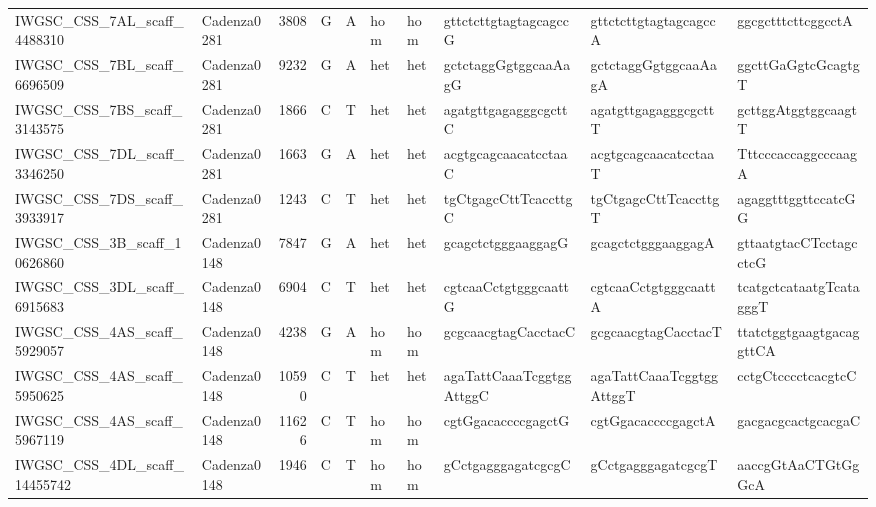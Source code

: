 \begin{longtable}{llrlllllll}
 IWGSC\_CSS\_7AL\_scaff\_4488310  & Cadenza0281 &       3808 & G         & A        & hom            & hom         & gttctcttgtagtagcagccG     & gttctcttgtagtagcagccA     & ggcgctttcttcggcctA        \\
 IWGSC\_CSS\_7BL\_scaff\_6696509  & Cadenza0281 &       9232 & G         & A        & het            & het         & gctctaggGgtggcaaAagG      & gctctaggGgtggcaaAagA      & ggcttGaGgtcGcagtgT        \\
 IWGSC\_CSS\_7BS\_scaff\_3143575  & Cadenza0281 &       1866 & C         & T        & het            & het         & agatgttgagagggcgcttC      & agatgttgagagggcgcttT      & gcttggAtggtggcaagtT       \\
 IWGSC\_CSS\_7DL\_scaff\_3346250  & Cadenza0281 &       1663 & G         & A        & het            & het         & acgtgcagcaacatcctaaC      & acgtgcagcaacatcctaaT      & TttcccaccaggcccaagA       \\
 IWGSC\_CSS\_7DS\_scaff\_3933917  & Cadenza0281 &       1243 & C         & T        & het            & het         & tgCtgagcCttTcaccttgC      & tgCtgagcCttTcaccttgT      & agaggtttggttccatcGG       \\
 IWGSC\_CSS\_3B\_scaff\_10626860  & Cadenza0148 &       7847 & G         & A        & het            & het         & gcagctctgggaaggagG        & gcagctctgggaaggagA        & gttaatgtacCTcctagcctcG    \\
 IWGSC\_CSS\_3DL\_scaff\_6915683  & Cadenza0148 &       6904 & C         & T        & het            & het         & cgtcaaCctgtgggcaattG      & cgtcaaCctgtgggcaattA      & tcatgctcataatgTcatagggT   \\
 IWGSC\_CSS\_4AS\_scaff\_5929057  & Cadenza0148 &       4238 & G         & A        & hom            & hom         & gcgcaacgtagCacctacC       & gcgcaacgtagCacctacT       & ttatctggtgaagtgacaggttCA  \\
 IWGSC\_CSS\_4AS\_scaff\_5950625  & Cadenza0148 &      10590 & C         & T        & het            & het         & agaTattCaaaTcggtggAttggC  & agaTattCaaaTcggtggAttggT  & cctgCtcccctcacgtcC        \\
 IWGSC\_CSS\_4AS\_scaff\_5967119  & Cadenza0148 &      11626 & C         & T        & hom            & hom         & cgtGgacaccccgagctG        & cgtGgacaccccgagctA        & gacgacgcactgcacgaC        \\
 IWGSC\_CSS\_4DL\_scaff\_14455742 & Cadenza0148 &       1946 & C         & T        & hom            & hom         & gCctgagggagatcgcgC        & gCctgagggagatcgcgT        & aaccgGtAaCTGtGgGcA        \\

\end{longtable}
